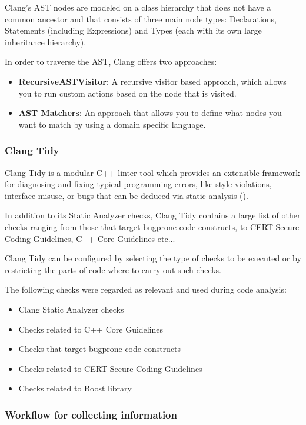 \documentclass{article}
\begin{document}
Clang’s AST nodes are modeled on a class hierarchy that does not have a common ancestor and that consists of three main node types: Declarations, Statements (including Expressions) and Types (each with its own large inheritance hierarchy).

In order to traverse the AST, Clang offers two approaches:
\begin{itemize}
	\item \textbf{RecursiveASTVisitor}: A recursive visitor based approach, which allows you to run custom actions based on the node that is visited.
	\item \textbf{AST Matchers}: An approach that allows you to define what nodes you want to match by using a domain specific language.
\end{itemize}

\subsubsection{Clang Tidy}

Clang Tidy is a modular C++ linter tool which provides an extensible framework for diagnosing and fixing typical programming errors, like style violations, interface misuse, or bugs that can be deduced via static analysis (\cite{clang_tidy}). 

In addition to its Static Analyzer checks, Clang Tidy contains a large list of other checks ranging from those that target bugprone code constructs, to CERT Secure Coding Guidelines, C++ Core Guidelines etc...

Clang Tidy can be configured by selecting the type of checks to be executed or by restricting the parts of code where to carry out such checks.

The following checks were regarded as relevant and used during code analysis:
\begin{itemize}
	\item Clang Static Analyzer checks
	\item Checks related to C++ Core Guidelines
	\item Checks that target bugprone code constructs
	\item Checks related to CERT Secure Coding Guidelines
	\item Checks related to Boost library
\end{itemize}

\subsubsection{Workflow for collecting information \label{data_collection}}
\end{document}

